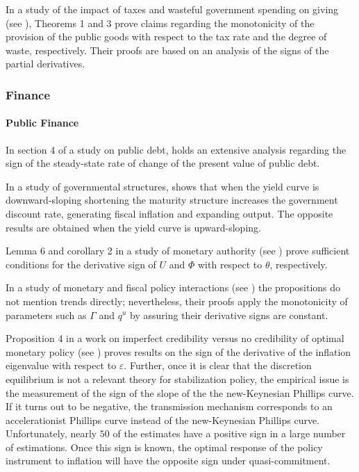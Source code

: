 \documentclass[11pt]{book}
\begin{document}
In a study of the impact of taxes and wasteful government spending on giving (see \cite{sheremeta2021impact}), Theorems 1 and 3 prove claims regarding
the monotonicity of the provision of the public goods with respect
to the tax rate and the degree of waste, respectively. Their proofs
are based on an analysis of the signs of the partial derivatives.


\subsubsection{Finance}

\paragraph{Public Finance}

In section 4 of a study on public debt, \cite{englmann2015can} holds an extensive analysis
regarding the sign of the steady-state rate of change of the present
value of public debt.

In a study of governmental structures, \cite{corhay2016government} shows that when the yield curve is downward-sloping shortening the maturity structure increases the government discount
rate, generating fiscal inflation and expanding output. The opposite
results are obtained when the yield curve is upward-sloping.

Lemma 6 and corollary 2 in a study of monetary authority (see \cite{bursian2018trust}) prove sufficient
conditions for the derivative sign of $U$ and $\Phi$ with respect
to $\theta$, respectively.

In a study of monetary and fiscal policy interactions (see \cite{haslag2020monetary}) the propositions do not
mention trends directly; nevertheless, their proofs apply the monotonicity of parameters
such as $\Gamma$ and $q^{u}$ by assuring their derivative signs
are constant.

Proposition 4 in a work on imperfect credibility versus no credibility of
optimal monetary policy (see \cite{chatelain2021imperfect}) proves results on the sign of the derivative of the inflation eigenvalue with respect
to $\varepsilon$. Further, once it is clear that the discretion equilibrium
is not a relevant theory for stabilization policy, the empirical issue
is the measurement of the sign of the slope of the the new-Keynesian
Phillips curve. If it turns out to be negative, the transmission mechanism
corresponds to an accelerationist Phillips curve instead of the new-Keynesian
Phillips curve. Unfortunately, nearly $50$ of the estimates have
a positive sign in a large number of estimations. Once this sign is
known, the optimal response of the policy instrument to inflation
will have the opposite sign under quasi-commitment.
\end{document}

